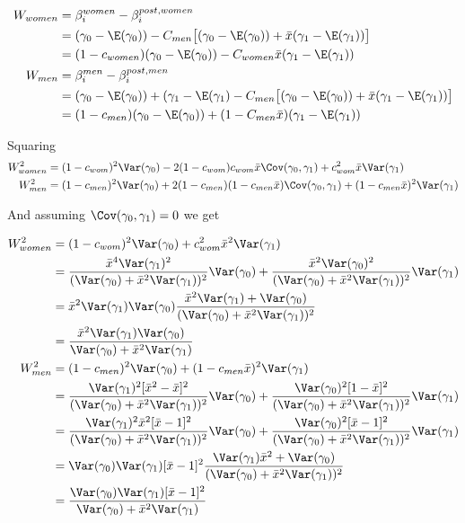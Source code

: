 \begin{align*}
	W_{women} &=  \beta_i^{women} - \beta_i^{post,women} \\
			&= (\gamma_0 - \E(\gamma_0)) - C_{men} \big[(\gamma_0 - \E(\gamma_0)) + \bar{x} ( \gamma_1 - \E(\gamma_1)) \big] \\
			&= ( 1 - c_{women}) (\gamma_0 - \E(\gamma_0)) - C_{women} \bar{x} (\gamma_1 - \E(\gamma_1)) \\
	W_{men} &=  \beta_i^{men} - \beta_i^{post,men} \\
			&= (\gamma_0 - \E(\gamma_0)) + (\gamma_1 - \E(\gamma_1) - C_{men} \big[(\gamma_0 - \E(\gamma_0)) + \bar{x} ( \gamma_1 - \E(\gamma_1)) \big] \\
			&= ( 1 - c_{men}) (\gamma_0 - \E(\gamma_0)) + (1 - C_{men} \bar{x}) (\gamma_1 - \E(\gamma_1))
\end{align*} 

Squaring
\begin{align*}
	W_{women}^2 &= (1 - c_{wom})^2 \Var(\gamma_0) - 2( 1 - c_{wom})c_{wom} \bar{x}\Cov(\gamma_0, \gamma_1) + c_{wom}^2 \bar{x} \Var(\gamma_1) \\
	W_{men}^2 &= (1 - c_{men})^2 \Var(\gamma_0) + 2( 1 - c_{men})(1 - c_{men} \bar{x})\Cov(\gamma_0, \gamma_1) + (1 - c_{men} \bar{x})^2 \Var(\gamma_1) \\
\end{align*} 

And assuming $\Cov(\gamma_0, \gamma_1) = 0$ we get

\begin{align*}
	W_{women}^2 &= (1 - c_{wom})^2 \Var(\gamma_0) + c_{wom}^2 \bar{x}^2 \Var(\gamma_1) \\
				&= \frac{\bar{x}^4 \Var(\gamma_1)^2}{(\Var(\gamma_0) + \bar{x}^2 \Var(\gamma_1))^2} \Var(\gamma_0) + \frac{\bar{x}^2 \Var(\gamma_0)^2}{(\Var(\gamma_0) + \bar{x}^2 \Var(\gamma_1))^2} \Var(\gamma_1) \\
				&= \bar{x}^2 \Var(\gamma_1) \Var(\gamma_0)\frac{\bar{x}^2 \Var(\gamma_1) + \Var(\gamma_0)}{(\Var(\gamma_0) + \bar{x}^2 \Var(\gamma_1))^2} \\
				&= \frac{\bar{x}^2 \Var(\gamma_1) \Var(\gamma_0)}{\Var(\gamma_0) + \bar{x}^2 \Var(\gamma_1)} \\
	W_{men}^2 &= (1 - c_{men})^2 \Var(\gamma_0) + (1 - c_{men} \bar{x})^2 \Var(\gamma_1) \\
	          &= \frac{\Var(\gamma_1)^2[\bar{x}^2 - \bar{x}]^2}{(\Var(\gamma_0) + \bar{x}^2 \Var(\gamma_1))^2} \Var(\gamma_0) + \frac{\Var(\gamma_0)^2[1 - \bar{x}]^2}{(\Var(\gamma_0) + \bar{x}^2 \Var(\gamma_1))^2} \Var(\gamma_1) \\
			  &= \frac{\Var(\gamma_1)^2 \bar{x}^2 [\bar{x} - 1]^2}{(\Var(\gamma_0) + \bar{x}^2 \Var(\gamma_1))^2} \Var(\gamma_0) + \frac{\Var(\gamma_0)^2[\bar{x} - 1]^2}{(\Var(\gamma_0) + \bar{x}^2 \Var(\gamma_1))^2} \Var(\gamma_1) \\
			  &= \Var(\gamma_0) \Var(\gamma_1) [\bar{x} - 1]^2 \frac{\Var(\gamma_1)\bar{x}^2 + \Var(\gamma_0)}{(\Var(\gamma_0) + \bar{x}^2 \Var(\gamma_1))^2}\\
			  &= \frac{\Var(\gamma_0) \Var(\gamma_1) [\bar{x} - 1]^2 }{\Var(\gamma_0) + \bar{x}^2 \Var(\gamma_1)}\\
\end{align*} 

